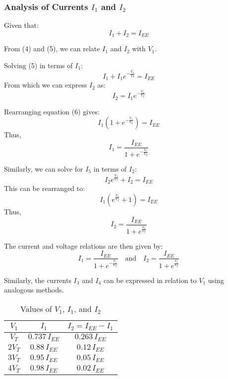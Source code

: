 \documentclass[a4paper,9pt,twoside,openany,twocolumn]{memoir}
\begin{document}
\subsubsection{Analysis of Currents \( I_1 \) and \( I_2 \)}

Given that:
\begin{equation}
I_1 + I_2 = I_{EE} \tag{5}
\end{equation}

From (4) and (5), we can relate \( I_1 \) and \( I_2 \) with \( V_1 \). 

Solving (5) in terms of \( I_1 \):
\begin{equation}
I_1 + I_1 e^{-\frac{V_1}{V_T}} = I_{EE} \tag{6}
\end{equation}
From which we can express \( I_2 \) as:
\begin{equation}
I_2 = I_1 e^{-\frac{V_1}{V_T}} \tag{7}
\end{equation}

Rearranging equation (6) gives:
\begin{equation}
I_1 (1 + e^{-\frac{V_1}{V_T}}) = I_{EE} \tag{7}
\end{equation}
Thus,
\begin{equation}
I_1 = \frac{I_{EE}}{1 + e^{-\frac{V_1}{V_T}}} \tag{8}
\end{equation}

Similarly, we can solve for \( I_5 \) in terms of \( I_2 \):
\begin{equation}
I_2 e^{\frac{V_1}{V_T}} + I_2 = I_{EE} \tag{9}
\end{equation}
This can be rearranged to:
\begin{equation}
I_1 (e^{\frac{V_1}{V_T}} + 1) = I_{EE} \tag{10}
\end{equation}
Thus,
\begin{equation}
I_2 = \frac{I_{EE}}{1 + e^{\frac{V_1}{V_T}}} \tag{11}
\end{equation}

The current and voltage relations are then given by:
\begin{equation}
I_1 = \frac{I_{EE}}{1 + e^{-\frac{V_1}{V_T}}} \quad \text{and} \quad I_2 = \frac{I_{EE}}{1 + e^{\frac{V_1}{V_T}}}
\end{equation}

Similarly, the currents \( I_3 \) and \( I_4 \) can be expressed in relation to \( V_1 \) using analogous methods.


\begin{table}[h!]
\centering
\begin{tabular}{|c|c|c|}
\hline
$V_1$ & $I_1$ & $I_2 = I_{EE} - I_1$ \\
\hline
$V_T$   & $0.737 \, I_{EE}$ & $0.263 \, I_{EE}$ \\
$2V_T$  & $0.88 \, I_{EE}$  & $0.12 \, I_{EE}$ \\
$3V_T$  & $0.95 \, I_{EE}$  & $0.05 \, I_{EE}$ \\
$4V_T$  & $0.98 \, I_{EE}$  & $0.02 \, I_{EE}$ \\
\hline
\end{tabular}
\caption{Values of $V_1$, $I_1$, and $I_2$}
\label{table:values}
\end{table}
\end{document}
